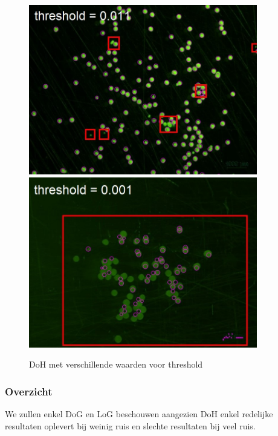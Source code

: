 \documentclass{article}
\begin{document}
\begin{multicols}{2}
\begin{figure}[H]
\centering
\includegraphics[width=0.89\textwidth]{images/doh_clown_weinig_ruis.jpg}
\includegraphics[width=0.89\textwidth]{images/doh_clown.jpg}
\caption{\label{fig:doh_is_clown}DoH met verschillende waarden voor threshold}
\end{figure}


\subsubsection{Overzicht}
We zullen enkel DoG en LoG beschouwen aangezien DoH enkel redelijke resultaten oplevert bij weinig ruis en slechte resultaten bij veel ruis. \\


\end{multicols}
\end{document}
